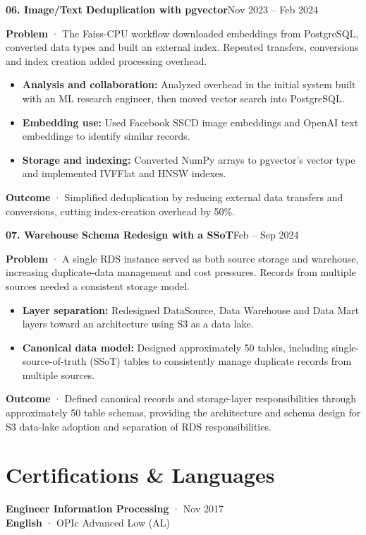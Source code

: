 \documentclass[a4paper,10pt]{article}
\newcommand{\project}[2]{\vspace{5pt}\textbf{\color{accent}#1}\hfill{\small\color{muted}#2}\par}
\begin{document}
\project{06. Image/Text Deduplication with pgvector}{Nov 2023 -- Feb 2024}
\textbf{Problem} · The Faiss-CPU workflow downloaded embeddings from PostgreSQL, converted data types and built an external index. Repeated transfers, conversions and index creation added processing overhead.
\begin{itemize}
\item \textbf{Analysis and collaboration:} Analyzed overhead in the initial system built with an ML research engineer, then moved vector search into PostgreSQL.
\item \textbf{Embedding use:} Used Facebook SSCD image embeddings and OpenAI text embeddings to identify similar records.
\item \textbf{Storage and indexing:} Converted NumPy arrays to pgvector's vector type and implemented IVFFlat and HNSW indexes.
\end{itemize}
\textbf{Outcome} · Simplified deduplication by reducing external data transfers and conversions, cutting index-creation overhead by 50\%.

\project{07. Warehouse Schema Redesign with a SSoT}{Feb -- Sep 2024}
\textbf{Problem} · A single RDS instance served as both source storage and warehouse, increasing duplicate-data management and cost pressures. Records from multiple sources needed a consistent storage model.
\begin{itemize}
\item \textbf{Layer separation:} Redesigned DataSource, Data Warehouse and Data Mart layers toward an architecture using S3 as a data lake.
\item \textbf{Canonical data model:} Designed approximately 50 tables, including single-source-of-truth (SSoT) tables to consistently manage duplicate records from multiple sources.
\end{itemize}
\textbf{Outcome} · Defined canonical records and storage-layer responsibilities through approximately 50 table schemas, providing the architecture and schema design for S3 data-lake adoption and separation of RDS responsibilities.

\section{Certifications \& Languages}
\textbf{Engineer Information Processing} · Nov 2017\\
\textbf{English} · OPIc Advanced Low (AL)
\end{document}
